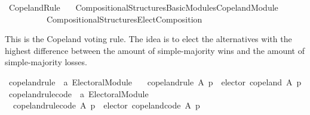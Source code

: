 %
\begin{isabellebody}%
%
%
\isadelimdocument
\isanewline
%
\endisadelimdocument
%
\isatagdocument
\isanewline
%
\isamarkuptrue%
%
\endisatagdocument
{\isafolddocument}%
%
\isadelimdocument
%
\endisadelimdocument
%
\isadelimtheory
%
\endisadelimtheory
%
\isatagtheory
{}\isamarkupfalse%
\ Copeland{\isacharunderscore}{\kern0pt}Rule\isanewline
\ \ \ {\isachardoublequoteopen}Compositional{\isacharunderscore}{\kern0pt}Structures{\isacharslash}{\kern0pt}Basic{\isacharunderscore}{\kern0pt}Modules{\isacharslash}{\kern0pt}Copeland{\isacharunderscore}{\kern0pt}Module{\isachardoublequoteclose}\isanewline
\ \ \ \ \ \ \ \ \ \ {\isachardoublequoteopen}Compositional{\isacharunderscore}{\kern0pt}Structures{\isacharslash}{\kern0pt}Elect{\isacharunderscore}{\kern0pt}Composition{\isachardoublequoteclose}\isanewline
{}%
\endisatagtheory
{\isafoldtheory}%
%
\isadelimtheory
%
\endisadelimtheory
%
\begin{isamarkuptext}%
This is the Copeland voting rule. The idea is to elect the alternatives with
the highest difference between the amount of simple-majority wins and the
amount of simple-majority losses.%
\end{isamarkuptext}\isamarkuptrue%
%
\isadelimdocument
%
\endisadelimdocument
%
\isatagdocument
%
\isamarkuptrue%
%
\endisatagdocument
{\isafolddocument}%
%
\isadelimdocument
%
\endisadelimdocument
{}\isamarkupfalse%
\ copeland{\isacharunderscore}{\kern0pt}rule\ {\isacharcolon}{\kern0pt}{\isacharcolon}{\kern0pt}\ {\isachardoublequoteopen}{\isacharprime}{\kern0pt}a\ Electoral{\isacharunderscore}{\kern0pt}Module{\isachardoublequoteclose}\ \isanewline
\ \ {\isachardoublequoteopen}copeland{\isacharunderscore}{\kern0pt}rule\ A\ p\ {\isacharequal}{\kern0pt}\ elector\ copeland\ A\ p{\isachardoublequoteclose}\isanewline
\isanewline
{}\isamarkupfalse%
\ copeland{\isacharunderscore}{\kern0pt}rule{\isacharunderscore}{\kern0pt}code\ {\isacharcolon}{\kern0pt}{\isacharcolon}{\kern0pt}\ {\isachardoublequoteopen}{\isacharprime}{\kern0pt}a\ Electoral{\isacharunderscore}{\kern0pt}Module{\isachardoublequoteclose}\ \isanewline
\ \ {\isachardoublequoteopen}copeland{\isacharunderscore}{\kern0pt}rule{\isacharunderscore}{\kern0pt}code\ A\ p\ {\isacharequal}{\kern0pt}\ elector\ copeland{\isacharunderscore}{\kern0pt}code\ A\ p{\isachardoublequoteclose}%

\end{isabellebody}
